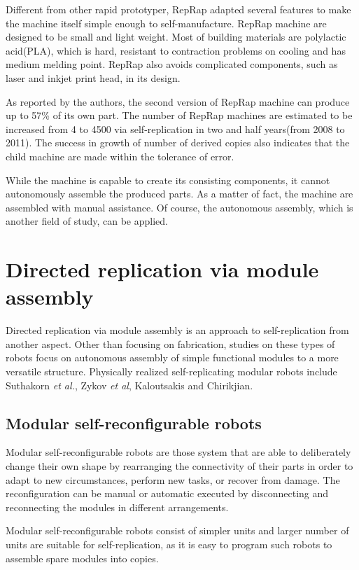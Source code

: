 \documentclass[12pt,twoside]{article}
\theoremstyle{plain}
\theoremstyle{definition}
\theoremstyle{remark}
\newcommand{\etal}{\textit{et al.}}
\begin{document}
Different from other rapid prototyper, RepRap adapted several features to make the machine itself simple enough to self-manufacture. RepRap machine are designed to be small and light weight. Most of building materials are polylactic acid(PLA), which is hard, resistant to contraction problems on cooling and has medium melding point. RepRap also avoids complicated components, such as laser and inkjet print head, in its design.

As reported by the authors, the second version of RepRap machine can produce up to 57\% of its own part. The number of RepRap machines are estimated to be increased from 4 to 4500 via self-replication in two and half years(from 2008 to 2011). The success in growth of number of derived copies also indicates that the child machine are made within the tolerance of error.

While the machine is capable to create its consisting components, it cannot autonomously assemble the produced parts. As a matter of fact, the machine are assembled with manual assistance. Of course, the autonomous assembly, which is another field of study, can be applied.

\section{Directed replication via module assembly}
\label{sec:module}
Directed replication via module assembly is an approach to self-replication from another aspect. Other than focusing on fabrication, studies on these types of robots focus on autonomous assembly of simple functional modules to a more versatile structure. Physically realized self-replicating modular robots include Suthakorn \etal\cite{suthakorn_autonomous_2003}, Zykov \textit{et al}\cite{zykov_self-reproducing_2005}, Kaloutsakis and Chirikjian\cite{kaloutsakis_stochastic_2011}.

\subsection{Modular self-reconfigurable robots}
Modular self-reconfigurable robots are those system that are able to deliberately
change their own shape by rearranging the connectivity of their parts in order to
adapt to new circumstances, perform new tasks, or recover from damage\cite{yim_modular_2007}. The reconfiguration can be manual or automatic executed by disconnecting and reconnecting the modules in different arrangements.

Modular self-reconfigurable robots consist of simpler units and larger number of units are suitable for self-replication, as it is easy to program such robots to assemble spare modules into copies. 
\end{document}
